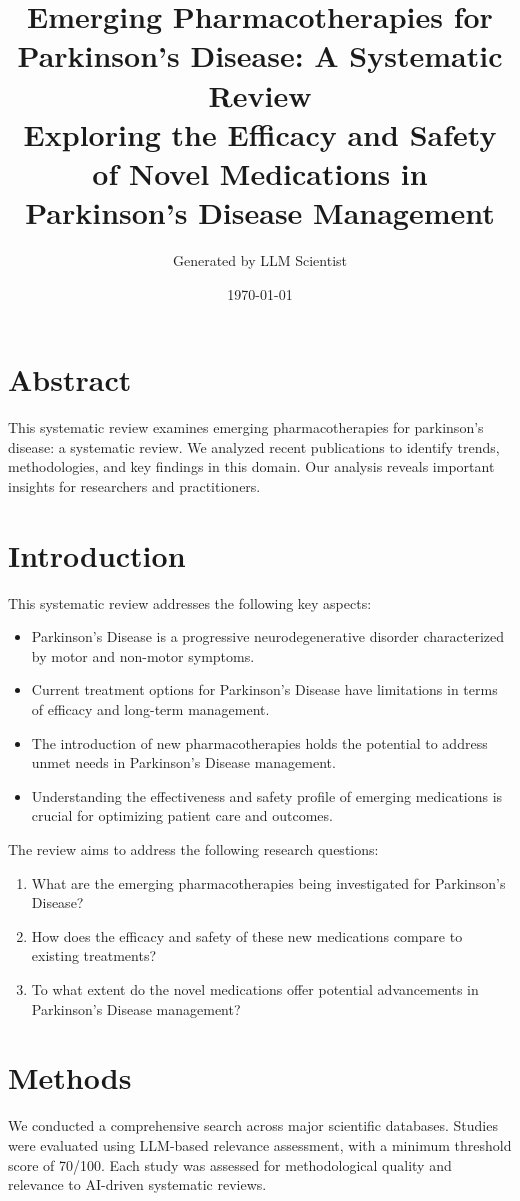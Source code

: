\documentclass{article}%
\title{Emerging Pharmacotherapies for Parkinson's Disease: A Systematic Review\\\large{Exploring the Efficacy and Safety of Novel Medications in Parkinson's Disease Management}}%
\author{Generated by LLM Scientist}%
\date{\today}%
\begin{document}
%
\normalsize%
\maketitle%
\section{Abstract}%
\label{sec:Abstract}%
This systematic review examines emerging pharmacotherapies for parkinson's disease: a systematic review. %
We analyzed recent publications to identify trends, methodologies, and key findings in this domain. %
Our analysis reveals important insights for researchers and practitioners.

%
\section{Introduction}%
\label{sec:Introduction}%
This systematic review addresses the following key aspects:%
\begin{itemize}%
\item Parkinson's Disease is a progressive neurodegenerative disorder characterized by motor and non-motor symptoms.%
\item Current treatment options for Parkinson's Disease have limitations in terms of efficacy and long-term management.%
\item The introduction of new pharmacotherapies holds the potential to address unmet needs in Parkinson's Disease management.%
\item Understanding the effectiveness and safety profile of emerging medications is crucial for optimizing patient care and outcomes.%
\end{itemize}%
\vspace{0.5cm}%
The review aims to address the following research questions:%
\begin{enumerate}%
\item What are the emerging pharmacotherapies being investigated for Parkinson's Disease?%
\item How does the efficacy and safety of these new medications compare to existing treatments?%
\item To what extent do the novel medications offer potential advancements in Parkinson's Disease management?%
\end{enumerate}

%
\section{Methods}%
\label{sec:Methods}%
We conducted a comprehensive search across major scientific databases. %
Studies were evaluated using LLM{-}based relevance assessment, with a minimum threshold score of 70/100. %
Each study was assessed for methodological quality and relevance to AI{-}driven systematic reviews.
\end{document}
